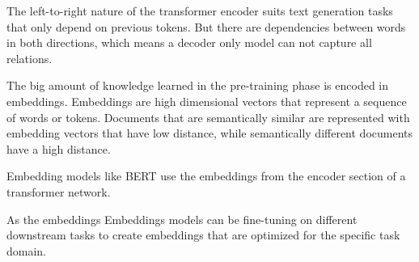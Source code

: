\documentclass[../../main.tex]{subfiles}
\begin{document}
The left-to-right nature of the transformer encoder suits text generation tasks that only depend on previous tokens.
But there are dependencies between words in both directions, which means a decoder only model can not capture all relations.

The big amount of knowledge learned in the pre-training phase is encoded in embeddings.
Embeddings are high dimensional vectors that represent a sequence of words or tokens.
Documents that are semantically similar are represented with embedding vectors that have low distance, while semantically different documents have a high distance.

Embedding models like BERT \cite{Devlin2019} use the embeddings from the encoder section of a transformer network.

As the embeddings
Embeddings models can be fine-tuning on different downstream tasks to create embeddings that are optimized for the specific task domain.
\end{document}
